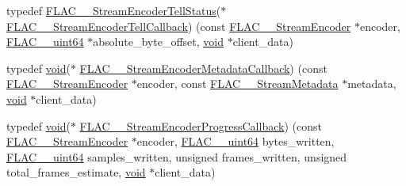 \begin{DoxyCompactItemize}
\item 
typedef \mbox{\hyperlink{group__flac__stream__encoder_gab628f63181250eb977a28bf12b7dd9ff}{F\+L\+A\+C\+\_\+\+\_\+\+Stream\+Encoder\+Tell\+Status}}($\ast$ \mbox{\hyperlink{group__flac__stream__encoder_gabefdf2279e1d0347d9f98f46da4e415b}{F\+L\+A\+C\+\_\+\+\_\+\+Stream\+Encoder\+Tell\+Callback}}) (const \mbox{\hyperlink{struct_f_l_a_c_____stream_encoder}{F\+L\+A\+C\+\_\+\+\_\+\+Stream\+Encoder}} $\ast$encoder, \mbox{\hyperlink{ordinals_8h_aa78c8c70a3eb8a58af7436f278acde8e}{F\+L\+A\+C\+\_\+\+\_\+uint64}} $\ast$absolute\+\_\+byte\+\_\+offset, \mbox{\hyperlink{_s_d_l__opengles2__gl2ext_8h_ae5d8fa23ad07c48bb609509eae494c95}{void}} $\ast$client\+\_\+data)
\item 
typedef \mbox{\hyperlink{_s_d_l__opengles2__gl2ext_8h_ae5d8fa23ad07c48bb609509eae494c95}{void}}($\ast$ \mbox{\hyperlink{group__flac__stream__encoder_ga091fbf3340d85bcbda1090c31bc320cf}{F\+L\+A\+C\+\_\+\+\_\+\+Stream\+Encoder\+Metadata\+Callback}}) (const \mbox{\hyperlink{struct_f_l_a_c_____stream_encoder}{F\+L\+A\+C\+\_\+\+\_\+\+Stream\+Encoder}} $\ast$encoder, const \mbox{\hyperlink{struct_f_l_a_c_____stream_metadata}{F\+L\+A\+C\+\_\+\+\_\+\+Stream\+Metadata}} $\ast$metadata, \mbox{\hyperlink{_s_d_l__opengles2__gl2ext_8h_ae5d8fa23ad07c48bb609509eae494c95}{void}} $\ast$client\+\_\+data)
\item 
typedef \mbox{\hyperlink{_s_d_l__opengles2__gl2ext_8h_ae5d8fa23ad07c48bb609509eae494c95}{void}}($\ast$ \mbox{\hyperlink{group__flac__stream__encoder_ga6e051c0e5837433f9e7cd56cd42ca6ba}{F\+L\+A\+C\+\_\+\+\_\+\+Stream\+Encoder\+Progress\+Callback}}) (const \mbox{\hyperlink{struct_f_l_a_c_____stream_encoder}{F\+L\+A\+C\+\_\+\+\_\+\+Stream\+Encoder}} $\ast$encoder, \mbox{\hyperlink{ordinals_8h_aa78c8c70a3eb8a58af7436f278acde8e}{F\+L\+A\+C\+\_\+\+\_\+uint64}} bytes\+\_\+written, \mbox{\hyperlink{ordinals_8h_aa78c8c70a3eb8a58af7436f278acde8e}{F\+L\+A\+C\+\_\+\+\_\+uint64}} samples\+\_\+written, unsigned frames\+\_\+written, unsigned total\+\_\+frames\+\_\+estimate, \mbox{\hyperlink{_s_d_l__opengles2__gl2ext_8h_ae5d8fa23ad07c48bb609509eae494c95}{void}} $\ast$client\+\_\+data)
\end{DoxyCompactItemize}
